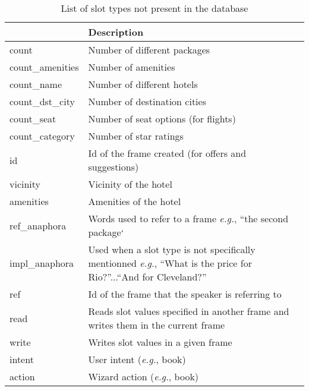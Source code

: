 \documentclass{article}
\theoremstyle{definition}
\begin{document}
\begin{table}[!h]
\begin{center}
  \tabulinesep=2pt
\caption{List of slot types not present in the database}
\begin{tabu}to 
\toprule
{} & \textbf{Description}                                                              \\ \midrule
count              & Number of different packages                                                      \\
count\_amenities   & Number of amenities                                                               \\
count\_name        & Number of different hotels                                                        \\
count\_dst\_city   & Number of destination cities                                                      \\
count\_seat        & Number of seat options (for flights)                                              \\
count\_category    & Number of star ratings                                                            \\
id                 & Id of the frame created (for offers and suggestions)                              \\ 
vicinity           & Vicinity of the hotel                                                             \\
amenities          & Amenities of the hotel                                                            \\
ref\_anaphora      & Words used to refer to a frame                                                    
                   \linebreak\textit{e.g.}, ``the second package`                                              \\
impl\_anaphora     & Used when a slot type is not specifically mentionned
                   \linebreak \textit{e.g.}, ``What is the price for Rio?''...``And for Cleveland?''            \\
ref                & Id of the frame that the speaker is referring to                                  \\
read               & Reads slot values specified in another frame and writes them in the current frame \\
write              & Writes slot values in a given frame                                               \\
intent             & User intent (\textit{e.g.}, book)                                                 \\
action             & Wizard action (\textit{e.g.}, book)                                               \\
\bottomrule
\end{tabu}
\label{tab:slot_type}
\end{center}
\end{table}

\end{document}
